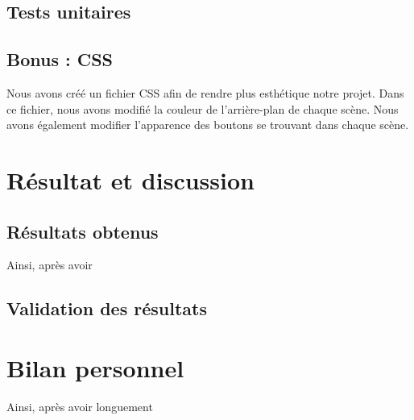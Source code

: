 \documentclass[11pt, titlepage]{article}
\begin{document}
\subsection{Tests unitaires}

\subsection{Bonus : CSS}

Nous avons créé un fichier CSS afin de rendre plus esthétique notre projet. Dans ce fichier, nous avons modifié la couleur de l'arrière-plan de chaque scène. Nous avons également modifier l'apparence des boutons se trouvant dans chaque scène.

\section{Résultat et discussion}

\subsection{Résultats obtenus}

Ainsi, après avoir 

\subsection{Validation des résultats}


\section{Bilan personnel}

Ainsi, après avoir longuement





\end{document}
